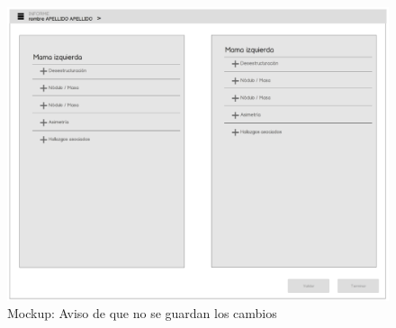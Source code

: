 \begin{figure}[ht]
\centering
\includegraphics[page=12,scale=0.4]{./imgs/mockup/mockup.pdf}
\caption{Mockup: Aviso de que no se guardan los cambios}
\label{fig:mockup:warning}
\end{figure}

